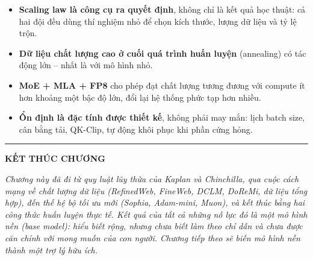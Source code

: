 \begin{tcolorbox}[title={Bài học rút ra}, colback=green!5!white, colframe=green!60!black, fonttitle=\bfseries]
\begin{itemize}
	\item \textbf{Scaling law là công cụ ra quyết định}, không chỉ là kết quả học thuật: cả hai đội đều dùng thí nghiệm nhỏ để chọn kích thước, lượng dữ liệu và tỷ lệ trộn.
	\item \textbf{Dữ liệu chất lượng cao ở cuối quá trình huấn luyện} (annealing) có tác động lớn -- nhất là với mô hình nhỏ.
	\item \textbf{MoE + MLA + FP8} cho phép đạt chất lượng tương đương với compute ít hơn khoảng một bậc độ lớn, đổi lại hệ thống phức tạp hơn nhiều.
	\item \textbf{Ổn định là đặc tính được thiết kế}, không phải may mắn: lịch batch size, cân bằng tải, QK-Clip, tự động khôi phục khi phần cứng hỏng.
\end{itemize}
\end{tcolorbox}

\bigskip
\hrule
\bigskip

\begin{center}
    \textbf{\Large KẾT THÚC CHƯƠNG \thechapter}
\end{center}

\textit{Chương này đã đi từ quy luật lũy thừa của Kaplan và Chinchilla, qua cuộc cách mạng về chất lượng dữ liệu (RefinedWeb, FineWeb, DCLM, DoReMi, dữ liệu tổng hợp), đến thế hệ bộ tối ưu mới (Sophia, Adam-mini, Muon), và kết thúc bằng hai công thức huấn luyện thực tế. Kết quả của tất cả những nỗ lực đó là một \emph{mô hình nền (base model)}: hiểu biết rộng, nhưng chưa biết làm theo chỉ dẫn và chưa được căn chỉnh với mong muốn của con người. Chương tiếp theo sẽ biến mô hình nền thành một trợ lý hữu ích.}

